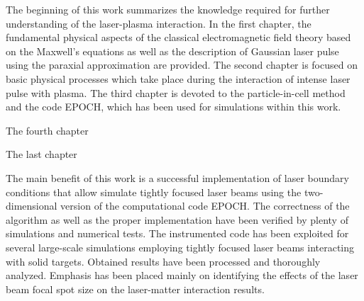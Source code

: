 The beginning of this work summarizes the knowledge required for further understanding of the laser-plasma interaction. In the first chapter, the fundamental physical aspects of the classical electromagnetic field theory based on the Maxwell's equations as well as the description of Gaussian laser pulse using the paraxial approximation are provided. The second chapter is focused on basic physical processes which take place during the interaction of intense laser pulse with plasma. The third chapter is devoted to the particle-in-cell method and the code EPOCH, which has been used for simulations within this work.

The fourth chapter

The last chapter 

The main benefit of this work is a successful implementation of laser boundary conditions that allow simulate tightly focused laser beams using the two-dimensional version of the computational code EPOCH. The correctness of the algorithm as well as the proper implementation have been verified by plenty of simulations and numerical tests. The instrumented code has been exploited for several large-scale simulations employing tightly focused laser beams interacting with solid targets. Obtained results have been processed and thoroughly analyzed. Emphasis has been placed mainly on identifying the effects of the laser beam focal spot size on the laser-matter interaction results.

